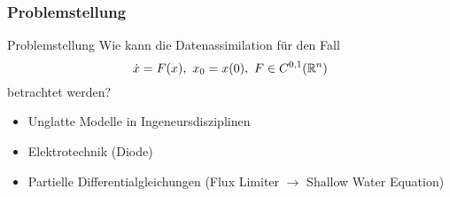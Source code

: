 \begin{frame}[<+->]
  \frametitle{Problemstellung}
  \begin{block}{Problemstellung}
  \centering
	Wie kann die Datenassimilation für den Fall
	\[
	  \dot{x} = F(x),~ x_0 = x(0),~F\in C^{0,1}(\mathbb R^n)
	\]
	betrachtet werden?
  \end{block}
   \begin{itemize}
    \item Unglatte Modelle in Ingeneursdisziplinen
    \item Elektrotechnik (Diode)
    \item Partielle Differentialgleichungen (Flux Limiter $\to$ Shallow Water Equation)
   \end{itemize}


\end{frame} 
